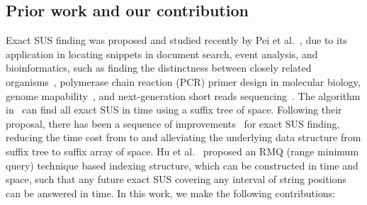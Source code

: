 \documentclass[11pt]{llncs}
\begin{document}
\subsection{Prior work and our contribution}
Exact SUS finding was proposed and studied recently by Pei et
al.~\cite{PWY-ICDE2013}, due to its application in locating snippets 
in document
search, event analysis, and bioinformatics, such as
finding the distinctness
between closely related organisms~\cite{HPMW-bio2005}, polymerase chain reaction
(PCR) primer design in molecular biology, genome
mapability~\cite{DEMKRGR-2012}, and next-generation short reads
sequencing~\cite{ABFMK-2015}.  The algorithm in~\cite{PWY-ICDE2013} can find all
exact SUS in  time using a suffix tree of  space.
Following their proposal, there has been a sequence of
improvements~\cite{TIBT2014,IKX-tcs2015}
for exact SUS finding, reducing the time cost from  to 
and alleviating the underlying data structure from suffix tree to
suffix array of  space. 
Hu et al.~\cite{HPT-spire2014} proposed an RMQ (range minimum query)
technique based indexing structure, which can be constructed in 
time and space, such that any future exact SUS covering any interval of
string positions can be answered in  time.
In this work, we make the following contributions: 
\end{document}
